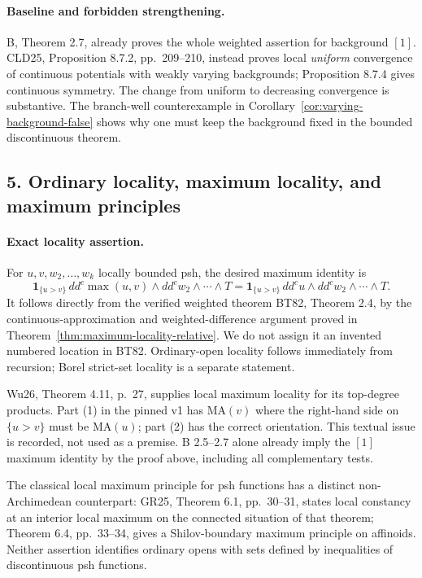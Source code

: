 \documentclass[11pt,a4paper]{article}
\numberwithin{equation}{section}
\theoremstyle{definition}
\theoremstyle{remark}
\begin{document}
\paragraph{Baseline and forbidden strengthening.}
B, Theorem 2.7, already proves the whole weighted assertion for background
\([1]\). CLD25, Proposition 8.7.2, pp.~209--210, instead proves local
\emph{uniform} convergence of continuous potentials with weakly varying
backgrounds; Proposition 8.7.4 gives continuous symmetry. The change from
uniform to decreasing convergence is substantive. The branch-well
counterexample in Corollary~\ref{cor:varying-background-false} shows why
one must keep the background fixed in the bounded discontinuous theorem.
\cite[Propositions 8.7.2, 8.7.4]{CLD25}

\subsection{5. Ordinary locality, maximum locality, and maximum principles}

\paragraph{Exact locality assertion.}
For \(u,v,w_2,\ldots,w_k\) locally bounded psh, the desired maximum
identity is
\[
 \mathbf1_{\{u>v\}}\,
 dd^c\max(u,v)\wedge dd^cw_2\wedge\cdots\wedge T
 =\mathbf1_{\{u>v\}}\,
 dd^cu\wedge dd^cw_2\wedge\cdots\wedge T.
\]
It follows directly from the verified weighted theorem BT82, Theorem 2.4,
by the continuous-approximation and weighted-difference argument proved
in Theorem~\ref{thm:maximum-locality-relative}. We do not assign it an
invented numbered location in BT82. Ordinary-open locality follows
immediately from recursion; Borel strict-set locality is a separate
statement.

Wu26, Theorem 4.11, p.~27, supplies local maximum locality for its
top-degree products. Part (1) in the pinned v1 has \(\mathrm{MA}(v)\)
where the right-hand side on \(\{u>v\}\) must be
\(\mathrm{MA}(u)\); part (2) has the correct orientation. This textual
issue is recorded, not used as a premise. B 2.5--2.7 alone already imply
the \([1]\) maximum identity by the proof above, including all
complementary tests.\cite[Theorem 4.11]{Wu26}

The classical local maximum principle for psh functions has a distinct
non-Archimedean counterpart: GR25, Theorem 6.1, pp.~30--31, states local
constancy at an interior local maximum on the connected situation of that
theorem; Theorem 6.4, pp.~33--34, gives a Shilov-boundary maximum
principle on affinoids. Neither assertion identifies ordinary opens with
sets defined by inequalities of discontinuous psh functions.
\cite[\S6]{GR25}
\end{document}
